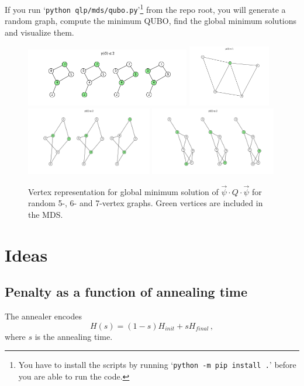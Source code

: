\documentclass[]{article}
\begin{document}
If you run `\texttt{python qlp/mds/qubo.py}'\footnote{You have to install the scripts by running `\texttt{python~-m~pip~install~.}' before you are able to run the code.} from the repo root, you will generate a random graph, compute the minimum QUBO, find the global minimum solutions and visualize them.

\begin{figure}[htb]
	\centering
	\includegraphics[width=0.64\textwidth]{mds-sol-n5-s.png}
	\includegraphics[width=0.32\textwidth]{mds-sol-n5.png}
	\includegraphics[width=0.49\textwidth]{mds-sol-n6.png}
	\includegraphics[width=0.49\textwidth]{mds-sol-n7.png}
	\caption{
		\label{fig:mds-sol-1} Vertex representation for global minimum solution of $\vec \psi \cdot Q \cdot \vec \psi$ for random 5-, 6- and 7-vertex graphs.
		Green vertices are included in the MDS.
	}
\end{figure}

\section{Ideas}
\subsection{Penalty as a function of annealing time}
The annealer encodes
\begin{equation}
	H(s) = (1-s)H_{init} + s H_{final} \, ,
\end{equation}
where $s$ is the annealing time.
\end{document}
